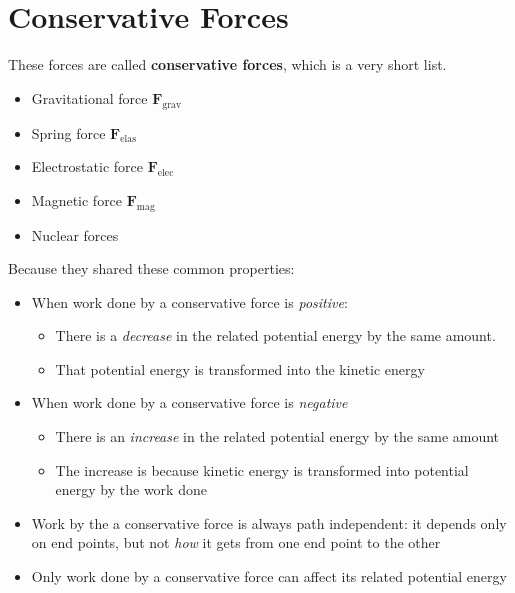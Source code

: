 \section{Conservative Forces}

These forces are called \textbf{conservative forces}, which is a very short
list.
\begin{itemize}[nosep]
\item Gravitational force $\bm F_\text{grav}$
\item Spring force $\bm F_\text{elas}$
\item Electrostatic force $\bm F_\text{elec}$
\item Magnetic force $\bm F_\text{mag}$
\item Nuclear forces
\end{itemize}
Because they shared these common properties:
\begin{definition}
  \begin{itemize}[itemsep=6pt]
  \item When work done by a conservative force is \emph{positive}:
    \begin{itemize}[nosep]
    \item There is a \emph{decrease} in the related potential energy by the
      same amount.
    \item That potential energy is transformed into the kinetic energy
    \end{itemize}
  \item When work done by a conservative force is \emph{negative}
    \begin{itemize}[nosep]
    \item There is an \emph{increase} in the related potential energy by the
      same amount
    \item The increase is because kinetic energy is transformed into potential
      energy by the work done
    \end{itemize}
  \item Work by the a conservative force is always path independent: it depends
    only on end points, but not \emph{how} it gets from one end point to the
    other
  \item Only work done by a conservative force can affect its related potential
    energy
  \end{itemize}
\end{definition}

